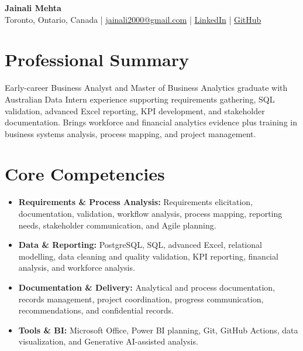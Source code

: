 \documentclass[letterpaper,10pt]{article}
\begin{document}
\begin{center}
  {\fontsize{17}{19}\selectfont\textbf{Jainali Mehta}}\\[2pt]
  \small Toronto, Ontario, Canada \;|\;
  \href{mailto:jainali2000@gmail.com}{jainali2000@gmail.com} \;|\;
  \href{https://www.linkedin.com/in/jainali-mehta}{LinkedIn} \;|\;
  \href{https://github.com/jainalimehta}{GitHub}
\end{center}
\vspace{-7pt}

\section{Professional Summary}
\small Early-career Business Analyst and Master of Business Analytics graduate with Australian Data Intern experience supporting requirements gathering, SQL validation, advanced Excel reporting, KPI development, and stakeholder documentation. Brings workforce and financial analytics evidence plus training in business systems analysis, process mapping, and project management.

\section{Core Competencies}
\begin{itemize}[leftmargin=0.16in,label=\textbullet,topsep=0pt,itemsep=1pt,parsep=0pt]
  \item \small \textbf{Requirements \& Process Analysis:} Requirements elicitation, documentation, validation, workflow analysis, process mapping, reporting needs, stakeholder communication, and Agile planning.
  \item \small \textbf{Data \& Reporting:} PostgreSQL, SQL, advanced Excel, relational modelling, data cleaning and quality validation, KPI reporting, financial analysis, and workforce analysis.
  \item \small \textbf{Documentation \& Delivery:} Analytical and process documentation, records management, project coordination, progress communication, recommendations, and confidential records.
  \item \small \textbf{Tools \& BI:} Microsoft Office, Power BI planning, Git, GitHub Actions, data visualization, and Generative AI-assisted analysis.
\end{itemize}
\end{document}
